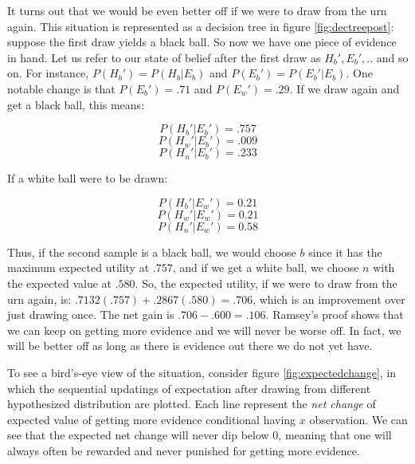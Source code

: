 It turns out that we would be even better off if we were to draw from
the urn again. This situation is represented as a decision tree in figure \ref{fig:dectreepost}: suppose the first draw yields a black ball. So now we
have one piece of evidence in hand. Let us refer to our state of belief
after the first draw as \(H_b', E_b',..\) and so on. For instance,
\(P(H_b') = P(H_b|E_b)\) and \(P(E_b') = P(E_b'|E_b)\). One notable
change is that \(P(E_b') = .71\) and \(P(E_w')=.29\). If we draw
again and get a black ball, this means:

\[P(H_b'|E_b') = .757\] \[P(H_w'|E_b') = .009\]
\[P(H_n'|E_b') = .233\]

If a white ball were to be drawn:

\[P(H_b'|E_w') = 0.21\] \[P(H_w'|E_w') = 0.21\] \[P(H_n'|E_w') = 0.58\]

Thus, if the second sample is a black ball, we would choose \(b\) since
it has the maximum expected utility at \(.757\), and if we get a white
ball, we choose \(n\) with the expected value at \(.580\). So, the
expected utility, if we were to draw from the urn again, is:
\(.7132(.757) + .2867(.580) = .706\), which is an improvement over
just drawing once. The net gain is \(.706 -.600 = .106\). Ramsey's
proof shows that we can keep on getting more evidence and we will never
be worse off. In fact, we will be better off as long as there is
evidence out there we do not yet have.

To see a bird's-eye view of the situation, consider figure \ref{fig:expectedchange}, in which the sequential updatings of expectation after drawing from different hypothesized distribution are plotted. Each line represent the \emph{net change} of expected value of getting more evidence conditional having $x$ observation. We can see that the expected net change will never dip below $0$, meaning that one will always often be rewarded and never punished for getting more evidence.

